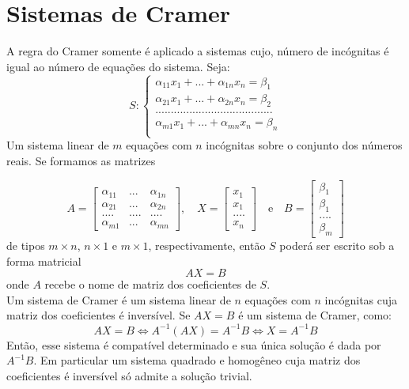 \section*{Sistemas de Cramer}
A regra do Cramer somente é aplicado a sistemas cujo, número de incógnitas é igual ao número de equações do sistema.
Seja:\\
\begin{equation*}
S:\begin{cases}
\alpha_{11}x_{1}+...+\alpha_{1n}x_{n}=\beta_{1}\\
\alpha_{21}x_{1}+...+\alpha_{2n}x_{n}=\beta_{2}\\
......................................\\
\alpha_{m1}x_{1}+...+\alpha_{mn}x_{n}=\beta_{n}\\
\end{cases}
\end{equation*} 
Um sistema linear de $m$ equações com $n$ incógnitas sobre o conjunto dos números reais. Se formamos as matrizes

\begin{equation*}
A=\begin{bmatrix}
\alpha_{11}& ... &\alpha_{1n}\\
\alpha_{21}& ... &\alpha_{2n}\\
....&....&....\\
\alpha_{m1}& ... &\alpha_{mn}
\end{bmatrix}, \quad X=\begin{bmatrix}
x_{1}\\
x_{1}\\
....\\
x_{n} 
\end{bmatrix}\quad \text{e} \quad B=\begin{bmatrix}
\beta_{1}\\
\beta_{1}\\
....\\
\beta_{m} 
\end{bmatrix}
\end{equation*}
de tipos $m\times n$, $n\times 1$ e $m\times 1$, respectivamente, então $S$ poderá ser escrito sob a forma matricial\\
\begin{equation*}
AX=B
\end{equation*}
onde $A$ recebe o nome de matriz dos coeficientes de $S$.\\

Um sistema de Cramer é um sistema linear de $n$ equações com $n$ incógnitas cuja matriz dos coeficientes é inversível. Se $AX=B$ é um sistema de Cramer, como:\\
\begin{equation*}
AX=B \Leftrightarrow A^{-1}(AX)=A^{-1}B \Leftrightarrow X=A^{-1}B
\end{equation*}
Então, esse sistema é compatível determinado e sua única solução é dada por $A^{-1}B$. Em particular um sistema quadrado e homogêneo cuja matriz dos coeficientes é inversível só admite a solução trivial.

